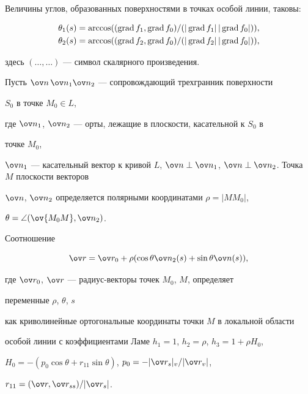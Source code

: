 Величины углов, образованных поверхностями в точках особой линии, таковы:  


\begin{align*} 


\theta_1(s)&=\arccos((\Grad f_1,\Grad f_0)/(|\Grad f_1|\,|\Grad f_0|)),\\


\theta_2(s)&=\arccos((\Grad f_2,\Grad f_0)/(|\Grad f_2|\,|\Grad f_0|)), 


\end{align*}   


здесь $(\dotsc,\dotsc)$ --- символ скалярного произведения. 


 


Пусть $\ov n\,\ov n_1\ov n_2$ --- сопровождающий трехгранник поверхности 


$S_0$ в точке $M_0\in L$,  


где $\ov n_1$, $\ov n_2$ --- орты, лежащие в плоскости, касательной к $S_0$ в 


точке $M_0$, 


$\ov n_1$ --- касательный вектор к кривой $L$, $\ov n\perp\ov n_1$, $\ov 


n\perp\ov n_2$. Точка $M$ плоскости векторов  


$\ov n$, $\ov n_2$ определяется полярными координатами $\rho=|MM_0|$, 


$\theta=\angle(\ov{M_0 M},\ov n_2)$. 


Соотношение  


\begin{equation} 


\ov r=\ov r_0+\rho(\cos\theta\ov n_2(s)+\sin\theta\ov n(s)), 


\end{equation} 


где $\ov r_0$, $\ov r$ --- радиус-векторы точек $M_0$, $M$, определяет 


переменные $\rho$, $\theta$, $s$ 


как криволинейные ортогональные координаты точки $M$ в локальной области  


особой линии с коэффициентами Ламе $h_1=1$, $h_2=\rho$, $h_3=1+\rho H_0$, 


$H_0=-(p_0\cos\theta+r_{11}\sin\theta)$, $p_0=-|\ov r_s|_v/|\ov r_v|$, 


$r_{11}=(\ov r,\ov r_{ss})/|\ov r_s|$. 


 


 


